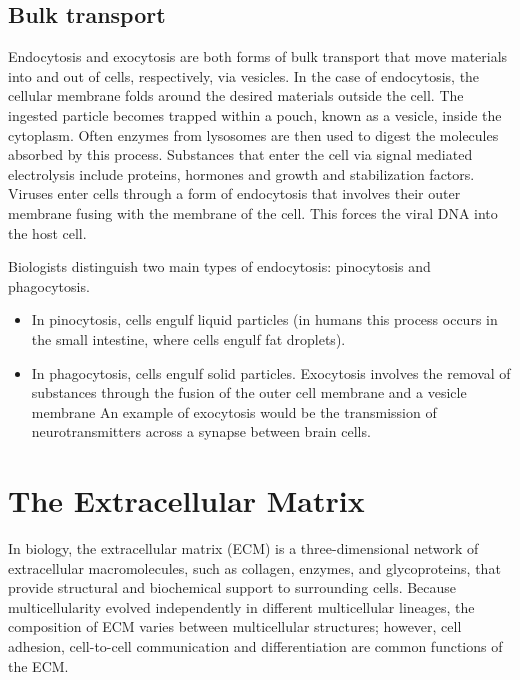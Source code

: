 \documentclass[
]{book}
\providecommand{\tightlist}{%
  \setlength{\itemsep}{0pt}\setlength{\parskip}{0pt}}
\begin{document}
\hypertarget{bulk-transport}{%
\subsection{Bulk transport}\label{bulk-transport}}

Endocytosis and exocytosis are both forms of bulk transport that move materials into and out of cells, respectively, via vesicles. In the case of endocytosis, the cellular membrane folds around the desired materials outside the cell. The ingested particle becomes trapped within a pouch, known as a vesicle, inside the cytoplasm. Often enzymes from lysosomes are then used to digest the molecules absorbed by this process. Substances that enter the cell via signal mediated electrolysis include proteins, hormones and growth and stabilization factors. Viruses enter cells through a form of endocytosis that involves their outer membrane fusing with the membrane of the cell. This forces the viral DNA into the host cell.

Biologists distinguish two main types of endocytosis: pinocytosis and phagocytosis.

\begin{itemize}
\tightlist
\item
  In pinocytosis, cells engulf liquid particles (in humans this process occurs in the small intestine, where cells engulf fat droplets).
\item
  In phagocytosis, cells engulf solid particles.
  Exocytosis involves the removal of substances through the fusion of the outer cell membrane and a vesicle membrane An example of exocytosis would be the transmission of neurotransmitters across a synapse between brain cells.
\end{itemize}

\hypertarget{the-extracellular-matrix}{%
\section{The Extracellular Matrix}\label{the-extracellular-matrix}}

In biology, the extracellular matrix (ECM) is a three-dimensional network of extracellular macromolecules, such as collagen, enzymes, and glycoproteins, that provide structural and biochemical support to surrounding cells. Because multicellularity evolved independently in different multicellular lineages, the composition of ECM varies between multicellular structures; however, cell adhesion, cell-to-cell communication and differentiation are common functions of the ECM.
\end{document}
